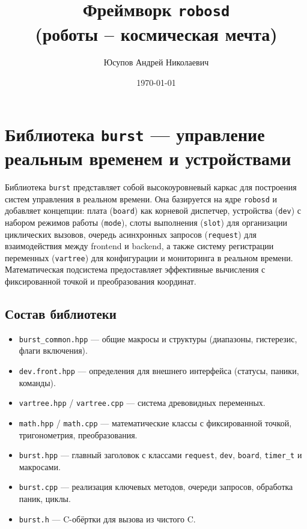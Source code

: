 \documentclass[a4paper,12pt]{article}
\title{Фреймворк \texttt{robosd} \\ (роботы -- космическая мечта)}
\author{Юсупов Андрей Николаевич}
\date{\today}
\begin{document}
\maketitle
\tableofcontents
\newpage



\section{Библиотека \texttt{burst} — управление реальным временем и устройствами}

Библиотека \texttt{burst} представляет собой высокоуровневый каркас для построения систем управления в реальном времени. Она базируется на ядре \texttt{robosd} и добавляет концепции: плата (\texttt{board}) как корневой диспетчер, устройства (\texttt{dev}) с набором режимов работы (\texttt{mode}), слоты выполнения (\texttt{slot}) для организации циклических вызовов, очередь асинхронных запросов (\texttt{request}) для взаимодействия между frontend и backend, а также систему регистрации переменных (\texttt{vartree}) для конфигурации и мониторинга в реальном времени. Математическая подсистема предоставляет эффективные вычисления с фиксированной точкой и преобразования координат.

\subsection{Состав библиотеки}

\begin{itemize}
    \item \texttt{burst\_common.hpp} — общие макросы и структуры (диапазоны, гистерезис, флаги включения).
    \item \texttt{dev.front.hpp} — определения для внешнего интерфейса (статусы, паники, команды).
    \item \texttt{vartree.hpp} / \texttt{vartree.cpp} — система древовидных переменных.
    \item \texttt{math.hpp} / \texttt{math.cpp} — математические классы с фиксированной точкой, тригонометрия, преобразования.
    \item \texttt{burst.hpp} — главный заголовок с классами \texttt{request}, \texttt{dev}, \texttt{board}, \texttt{timer\_t} и макросами.
    \item \texttt{burst.cpp} — реализация ключевых методов, очереди запросов, обработка паник, циклы.
    \item \texttt{burst.h} — C-обёртки для вызова из чистого C.
\end{itemize}
\end{document}
